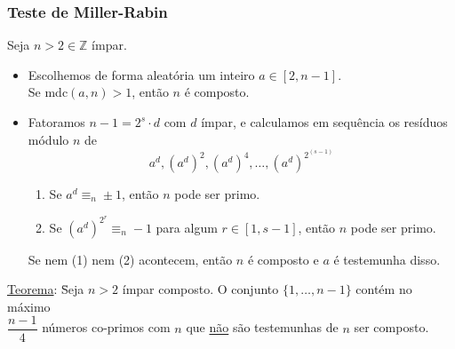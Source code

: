 \documentclass{article}
\begin{document}
\subsubsection{Teste de Miller-Rabin}
Seja $n > 2 \in \mathbb{Z}$ ímpar.
\begin{itemize}
  \item Escolhemos de forma aleatória um inteiro $a \in [2, n - 1]$. \\[5pt]
        Se mdc$(a,n) > 1$, então $n$ é composto.
  \item Fatoramos $n - 1 = 2^s \cdot d$ com $d$ ímpar, e calculamos em sequência os resíduos módulo $n$ de \\
        \[ a^d, {\left( a^d \right)}^2, {\left( a^d \right)}^4, \hdots, {\left( a^d \right)}^{2^{(s - 1)}} \]
        \begin{enumerate}
          \item Se $a^d \equiv_n \pm 1$, então $n$ pode ser primo.
          \item Se ${\left( a^d \right)}^{2^r} \equiv_n -1$ para algum $r \in [1, s - 1]$, então $n$ pode ser primo.
        \end{enumerate}
        Se nem (1) nem (2) acontecem, então $n$ é composto e $a$ é testemunha disso.
\end{itemize}
\begin{tabbing}
  \uline{Teorema}: \= Seja $n > 2$ ímpar composto. O conjunto $\{ 1, \hdots, n-1\}$ contém no máximo \\[5pt]
  \> $\dfrac{n - 1}{4}$ números co-primos com $n$ que \uline{não} são testemunhas de $n$ ser composto.
\end{tabbing}
\end{document}
